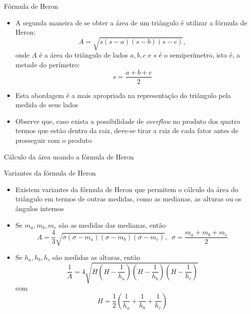 \begin{frame}[fragile]{Fórmula de Heron}

    \begin{itemize}
        \item A segunda maneira de se obter a área de um triângulo é utilizar a fórmula de Heron:
        \[
            A = \sqrt{s(s - a)(s - b)(s - c)},
        \]
        onde $A$ é a área do triângulo de lados $a, b, c$ e $s$ é o semiperímetro, isto é, a
        metade do perímetro:
        \[
            s = \frac{a + b + c}{2}
        \]
        \pause

        \item Esta abordagem é a mais apropriada na representação do triângulo pela medida de seus 
            lados
        \pause

        \item Observe que, caso exista a possibilidade de \textit{overflow} no produto dos quatro 
            termos que estão dentro da raiz, deve-se tirar a raiz de cada fator antes de prosseguir com o produto

    \end{itemize}

\end{frame}

\begin{frame}[fragile]{Cálculo da área usando a fórmula de Heron}
\end{frame}

\begin{frame}[fragile]{Variantes da fórmula de Heron}

    \begin{itemize}
        \item Existem variantes da fórmula de Heron que permitem o cálculo da área do triângulo em termos de outras medidas, como as medianas, as alturas ou os ângulos internos
        \pause

        \item Se $m_a, m_b, m_c$ são as medidas das medianas, então
        \[
            A = \frac{4}{3}\sqrt{\sigma(\sigma - m_a)(\sigma - m_b)(\sigma - m_c)}, \, \, \, \sigma = \frac{m_a + m_b + m_c}{2}
        \]
        \pause

        \item Se $h_a, h_b, h_c$ são medidas as alturas, então
        \[
            \frac{1}{A} = 4\sqrt{H\left(H - \frac{1}{h_a}\right)\left(H - \frac{1}{h_b}\right)\left(H - \frac{1}{h_c}\right)}
        \]
        com
        \[H = \frac{1}{2}\left(\frac{1}{h_a} + \frac{1}{h_b} + \frac{1}{h_c}\right)
        \]

    \end{itemize}

\end{frame}

